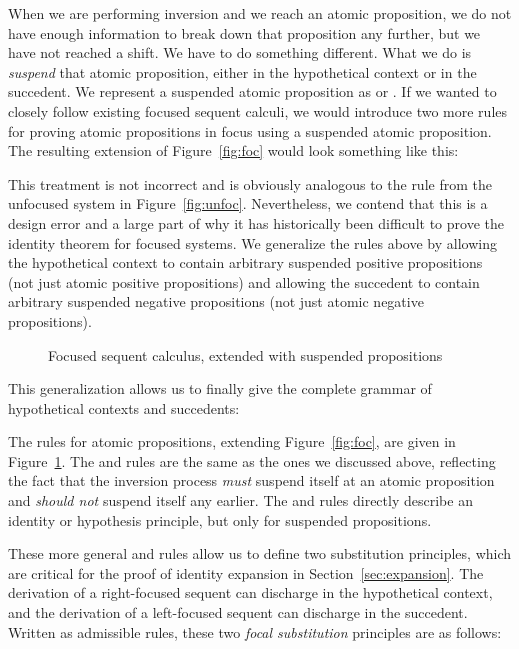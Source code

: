 \documentclass[acmtocl]{robtrans}\pdfoutput=1
\begin{document}
When we are performing inversion and we reach an atomic proposition,
we do not have enough information to break down that proposition any
further, but we have not reached a shift. We have to do something
different. What we do is {\it suspend} that atomic proposition, either
in the hypothetical context or in the succedent. We represent a
suspended atomic proposition as  or . If we
wanted to closely follow existing focused sequent calculi, we would
introduce two more rules for proving atomic propositions in focus
using a suspended atomic proposition. The resulting extension of
Figure~\ref{fig:foc} would look something like this:


This treatment is not incorrect and is obviously analogous to the  rule from the unfocused system in
Figure~\ref{fig:unfoc}. Nevertheless, we contend that this is a design
error and a large part of why it has historically been difficult to
prove the identity theorem for focused systems. We generalize the
rules above
by allowing the hypothetical context to contain arbitrary
suspended positive propositions (not just atomic positive
propositions) and allowing the succedent to contain arbitrary
suspended negative propositions (not just atomic negative
propositions).

\begin{figure}


\caption{Focused sequent calculus, extended with suspended propositions}
\label{fig:foc-atom}
\end{figure}


This generalization allows us to finally give the complete grammar of 
hypothetical contexts and succedents: 

The rules for atomic propositions, extending Figure~\ref{fig:foc}, are
given in Figure~\ref{fig:foc-atom}. The  and  rules
are the same as the ones we discussed above, reflecting the fact that
the inversion process {\it must} suspend itself at an atomic
proposition and {\it should not} suspend itself any earlier.  The
 and  rules directly describe an identity
or hypothesis principle, but only for suspended propositions.


These more general  and  rules allow us to define two
substitution principles, which are critical for the proof of identity
expansion in Section~\ref{sec:expansion}. The derivation of a
right-focused sequent  can discharge  in the
hypothetical context, and the derivation of a left-focused sequent
 can discharge  in the succedent. Written as
admissible rules, these two {\it focal substitution} principles are as
follows:
\end{document}
